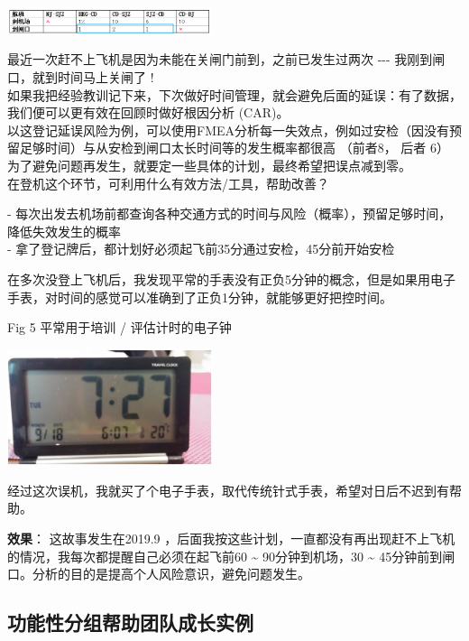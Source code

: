
\includegraphics[width=6cm]{风险与机会41.png}

最近一次赶不上飞机是因为未能在关闸门前到，之前已发生过两次 -\/-\/-
我刚到闸口，就到时间马上关闸了 !\\
如果我把经验教训记下来，下次做好时间管理，就会避免后面的延误：有了数据，我们便可以更有效在回顾时做好根因分析
(CAR)。\\
以这登记延误风险为例，可以使用FMEA分析每一失效点，例如过安检（因没有预留足够时间）与从安检到闸口太长时间等的发生概率都很高
（前者8， 后者 6）\\
为了避免问题再发生，就要定一些具体的计划，最终希望把误点减到零。\\
在登机这个环节，可利用什么有效方法/工具，帮助改善？

-
每次出发去机场前都查询各种交通方式的时间与风险（概率），预留足够时间，降低失效发生的概率\\
- 拿了登记牌后，都计划好必须起飞前35分通过安检，45分前开始安检

在多次没登上飞机后，我发现平常的手表没有正负5分钟的概念，但是如果用电子手表，对时间的感觉可以准确到了正负1分钟，就能够更好把控时间。

Fig 5 平常用于培训 / 评估计时的电子钟


\includegraphics[width=6cm]{风险与机会5_闹钟.png}

经过这次误机，我就买了个电子手表，取代传统针式手表，希望对日后不迟到有帮助。

\textbf{效果}： 这故事发生在2019.9
，后面我按这些计划，一直都没有再出现赶不上飞机的情况，我每次都提醒自己必须在起飞前60
\textasciitilde{} 90分钟到机场，30 \textasciitilde{}
45分钟前到闸口。分析的目的是提高个人风险意识，避免问题发生。

\hypertarget{ux529fux80fdux6027ux5206ux7ec4ux5e2eux52a9ux56e2ux961fux6210ux957fux5b9eux4f8b}{%
\subsection{功能性分组帮助团队成长实例}\label{ux529fux80fdux6027ux5206ux7ec4ux5e2eux52a9ux56e2ux961fux6210ux957fux5b9eux4f8b}}

